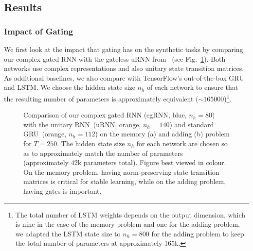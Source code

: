 \documentclass{article}
\begin{document}
\subsection{Results}

\subsubsection{Impact of Gating}
We first look at the impact that gating has on the synthetic tasks by comparing our complex gated RNN with the gateless uRNN from~\cite{Arjovsky} (see Fig.~\ref{fig:unnGRU}). Both networks use complex representations and also unitary state transition matrices. As additional baselines, we also compare with TensorFlow's out-of-the-box GRU and LSTM.  We choose the hidden state size $n_h$ of each network to ensure that the resulting number of parameters is approximately equivalent ($\sim 165000$)\footnote{The total number of LSTM weights depends on the output dimension, which is nine in the case of the memory problem and one for the adding problem, we adapted the LSTM state size to $n_h=800$ for the adding problem to keep the total number of parameters at approximately 165k.}.

\begin{figure}[t!]%
\centering
{}
\qquad
{}%
    \caption{\small Comparison of our complex gated RNN (cgRNN, blue, $n_h\!=\!80$) with the unitary RNN~\cite{Arjovsky}(uRNN, orange, $n_h\!=\!140$) and standard GRU~\cite{cho-al-emnlp14}(orange, $n_h\!=\!112$) on the memory (a) and adding (b) problem for $T\!=\!250$. The hidden state size $n_h$ for each network are chosen so as to approximately match the number of parameters (approximately 42k parameters total).  Figure best viewed in colour.  On the memory problem, having norm-preserving state transition matrices is critical for stable learning, while on the adding problem, having gates is important.}
    \label{fig:unnGRU}
    \vspace{-0.5cm}
\end{figure}
\end{document}
